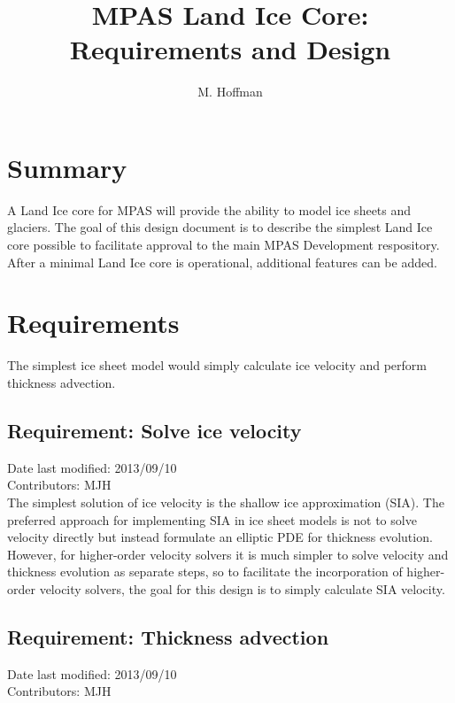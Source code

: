 \documentclass[11pt]{report}
\begin{document}
\title{MPAS Land Ice Core: \\
Requirements and Design}
\author{M. Hoffman}

\maketitle
\tableofcontents


\chapter{Summary}

A Land Ice core for MPAS will provide the ability to model ice sheets and glaciers.  The goal of this design document is to describe the simplest Land Ice core possible to facilitate approval to the main MPAS Development respository.  After a minimal Land Ice core is operational, additional features can be added.



\chapter{Requirements}

The simplest ice sheet model would simply calculate ice velocity and perform thickness advection.

\section{Requirement: Solve ice velocity}
Date last modified: 2013/09/10 \\
Contributors: MJH \\

The simplest solution of ice velocity is the shallow ice approximation (SIA).  The preferred approach for implementing SIA in ice sheet models is not to solve velocity directly but instead formulate an elliptic PDE for thickness evolution.   However, for higher-order velocity solvers it is much simpler to solve velocity and thickness evolution as separate steps, so to facilitate the incorporation of higher-order velocity solvers, the goal for this design is to simply calculate SIA velocity.


\section{Requirement: Thickness advection}
Date last modified: 2013/09/10 \\
Contributors: MJH \\
\end{document}

